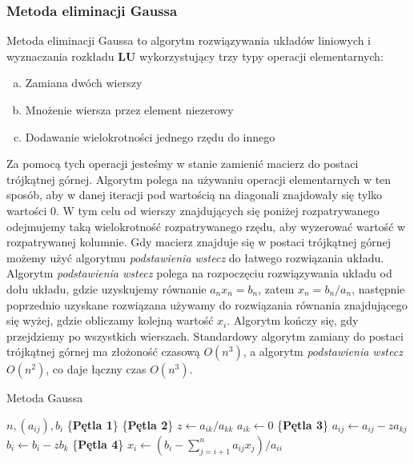 \documentclass[12pt]{article}
\begin{document}
\subsubsection*{Metoda eliminacji Gaussa}
Metoda eliminacji Gaussa to algorytm rozwiązywania układów liniowych i wyznaczania rozkładu \textbf{LU} wykorzystujący trzy typy operacji elementarnych:
\begin{enumerate}[(a)]
	\item Zamiana dwóch wierszy
	\item Mnożenie wiersza przez element niezerowy
	\item Dodawanie wielokrotności jednego rzędu do innego
\end{enumerate}
Za pomocą tych operacji jesteśmy w stanie zamienić macierz do postaci trójkątnej górnej. Algorytm polega na używaniu operacji elementarnych w ten sposób, aby w danej iteracji pod wartością na diagonali znajdowały się tylko wartości 0. W tym celu od wierszy znajdujących się poniżej rozpatrywanego odejmujemy taką wielokrotność rozpatrywanego rzędu, aby wyzerować wartość w rozpatrywanej kolumnie. Gdy macierz znajduje się w postaci trójkątnej górnej możemy użyć algorytmu \textit{podstawienia wstecz} do łatwego rozwiązania układu. Algorytm \textit{podstawienia wstecz} polega na rozpoczęciu rozwiązywania układu od dołu układu, gdzie uzyskujemy równanie $a_n x_n = b_n$, zatem $x_n = b_n/a_n$, następnie poprzednio uzyskane rozwiązana używamy do rozwiązania równania znajdującego się wyżej, gdzie obliczamy kolejną wartość $x_i$. Algorytm kończy się, gdy przejdziemy po wszystkich wierszach.
Standardowy algorytm zamiany do postaci trójkątnej górnej ma złożoność czasową $O(n^3)$, a algorytm \textit{podstawienia wstecz} $O(n^2)$, co daje łączny czas $O(n^3)$.

\begin{algorithm} %
\caption{Metoda Gaussa}
\label{alg1} %
\begin{algorithmic} %
    \REQUIRE $n, (a_{ij}), b_i$
    \STATE \{\textbf{Pętla 1}\}
    		\STATE \{\textbf{Pętla 2}\}
		\STATE $z \leftarrow a_{ik}/a_{kk}$
		\STATE $a_{ik} \leftarrow 0$
    			\STATE \{\textbf{Pętla 3}\}
				\STATE $a_{ij} \leftarrow a_{ij} - z a_{kj}$
    			\ENDFOR
    			\STATE $b_i \leftarrow b_i - z b_k$
    		\ENDFOR
    \ENDFOR
    \STATE \{\textbf{Pętla 4}\}
		\STATE $x_i \leftarrow (b_i - \sum^n_{j=i+1}a_{ij}x_j)/a_{ii}$
    \ENDFOR
\end{algorithmic}
\end{algorithm}
\end{document}
